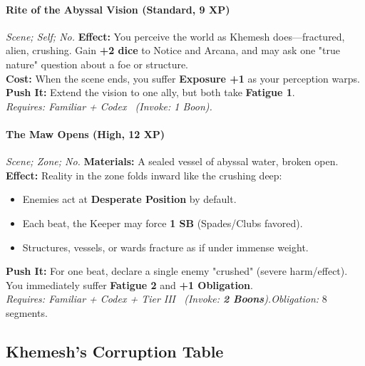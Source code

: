 \paragraph{Rite of the Abyssal Vision (Standard, 9 XP)} \emph{Scene; Self; No.}
\textbf{Effect:} You perceive the world as Khemesh does—fractured, alien, crushing. Gain \textbf{+2 dice} to Notice and Arcana, and may ask one "true nature" question about a foe or structure.\\
\textbf{Cost:} When the scene ends, you suffer \textbf{Exposure +1} as your perception warps.\\
\textbf{Push It:} Extend the vision to one ally, but both take \textbf{Fatigue 1}.\\
\emph{Requires: Familiar + Codex \ (\textit{Invoke:} 1 Boon).}

\paragraph{The Maw Opens (High, 12 XP)} \emph{Scene; Zone; No.}
\textbf{Materials:} A sealed vessel of abyssal water, broken open.\\
\textbf{Effect:} Reality in the zone folds inward like the crushing deep: 
\begin{itemize}
  \item Enemies act at \textbf{Desperate Position} by default.  
  \item Each beat, the Keeper may force \textbf{1 SB} (Spades/Clubs favored).  
  \item Structures, vessels, or wards fracture as if under immense weight.  
\end{itemize}
\textbf{Push It:} For one beat, declare a single enemy "crushed" (severe harm/effect). You immediately suffer \textbf{Fatigue 2} and \textbf{+1 Obligation}.\\
\emph{Requires: Familiar + Codex + Tier III \ (\textit{Invoke:} \textbf{2 Boons}).}\quad \emph{Obligation:} 8 segments.

\subsection*{Khemesh's Corruption Table}
\label{sec:khemesh-corruption}


